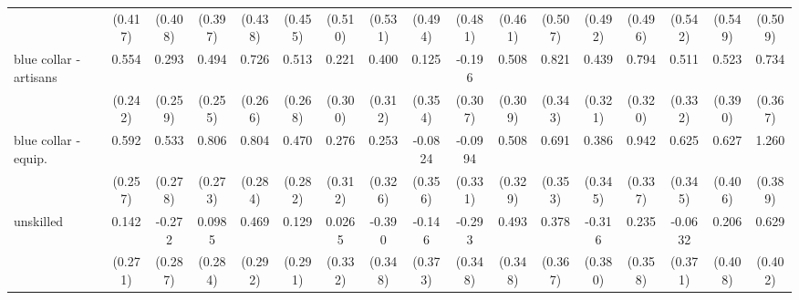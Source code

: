 {\begin{tabular}{l*{16}{c}}
                    &     (0.417)         &     (0.408)         &     (0.397)         &     (0.438)         &     (0.455)         &     (0.510)         &     (0.531)         &     (0.494)         &     (0.481)         &     (0.461)         &     (0.507)         &     (0.492)         &     (0.496)         &     (0.542)         &     (0.549)         &     (0.509)         \\
[1em]
blue collar - artisans&       0.554\sym{*}  &       0.293         &       0.494         &       0.726\sym{**} &       0.513         &       0.221         &       0.400         &       0.125         &      -0.196         &       0.508         &       0.821\sym{*}  &       0.439         &       0.794\sym{*}  &       0.511         &       0.523         &       0.734\sym{*}  \\
                    &     (0.242)         &     (0.259)         &     (0.255)         &     (0.266)         &     (0.268)         &     (0.300)         &     (0.312)         &     (0.354)         &     (0.307)         &     (0.309)         &     (0.343)         &     (0.321)         &     (0.320)         &     (0.332)         &     (0.390)         &     (0.367)         \\
[1em]
blue collar - equip.&       0.592\sym{*}  &       0.533         &       0.806\sym{**} &       0.804\sym{**} &       0.470         &       0.276         &       0.253         &     -0.0824         &     -0.0994         &       0.508         &       0.691         &       0.386         &       0.942\sym{**} &       0.625         &       0.627         &       1.260\sym{**} \\
                    &     (0.257)         &     (0.278)         &     (0.273)         &     (0.284)         &     (0.282)         &     (0.312)         &     (0.326)         &     (0.356)         &     (0.331)         &     (0.329)         &     (0.353)         &     (0.345)         &     (0.337)         &     (0.345)         &     (0.406)         &     (0.389)         \\
[1em]
unskilled           &       0.142         &      -0.272         &      0.0985         &       0.469         &       0.129         &      0.0265         &      -0.390         &      -0.146         &      -0.293         &       0.493         &       0.378         &      -0.316         &       0.235         &     -0.0632         &       0.206         &       0.629         \\
                    &     (0.271)         &     (0.287)         &     (0.284)         &     (0.292)         &     (0.291)         &     (0.332)         &     (0.348)         &     (0.373)         &     (0.348)         &     (0.348)         &     (0.367)         &     (0.380)         &     (0.358)         &     (0.371)         &     (0.408)         &     (0.402)         \\

\end{tabular}}
